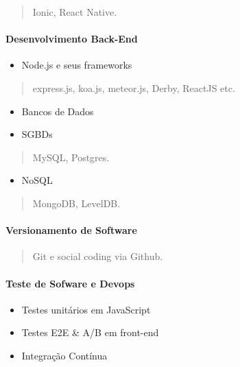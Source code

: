 \documentclass[]{article}
\providecommand{\tightlist}{%
  \setlength{\itemsep}{0pt}\setlength{\parskip}{0pt}}
\let\oldparagraph\paragraph
\renewcommand{\paragraph}[1]{\oldparagraph{#1}\mbox{}}
\begin{document}
\begin{quote}
Ionic, React Native.
\end{quote}

\paragraph{Desenvolvimento Back-End}\label{desenvolvimento-back-end}

\begin{itemize}
\tightlist
\item
  Node.js e seus frameworks
\end{itemize}

\begin{quote}
express.js, koa.js, meteor.js, Derby, ReactJS etc.
\end{quote}

\begin{itemize}
\item
  Bancos de Dados
\item
  SGBDs
\end{itemize}

\begin{quote}
MySQL, Postgres.
\end{quote}

\begin{itemize}
\tightlist
\item
  NoSQL
\end{itemize}

\begin{quote}
MongoDB, LevelDB.
\end{quote}

\paragraph{Versionamento de Software}\label{versionamento-de-software}

\begin{quote}
Git e social coding via Github.
\end{quote}

\paragraph{Teste de Sofware e Devops}\label{teste-de-sofware-e-devops}

\begin{itemize}
\item
  Testes unitários em JavaScript
\item
  Testes E2E \& A/B em front-end
\item
  Integração Contínua
\end{itemize}
\end{document}
